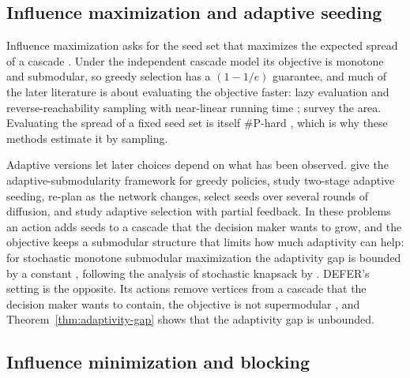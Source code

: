 \documentclass[preprint,11pt]{elsarticle}
\theoremstyle{definition}
\theoremstyle{remark}
\begin{document}
\subsection{Influence maximization and adaptive seeding}

Influence maximization asks for the seed set that maximizes the expected spread of a cascade \citep{kempe2003}. Under the independent cascade model its objective is monotone and submodular, so greedy selection has a $(1-1/e)$ guarantee, and much of the later literature is about evaluating the objective faster: lazy evaluation \citep{leskovec2007b} and reverse-reachability sampling with near-linear running time \citep{borgs2014,tang2014}; \citet{li2018} survey the area. Evaluating the spread of a fixed seed set is itself \#P-hard \citep{chen2010}, which is why these methods estimate it by sampling.

Adaptive versions let later choices depend on what has been observed. \citet{golovinkrause2011} give the adaptive-submodularity framework for greedy policies, \citet{seemansinger2013} study two-stage adaptive seeding, \citet{tong2017} re-plan as the network changes, \citet{sun2018} select seeds over several rounds of diffusion, and \citet{yuan2017} study adaptive selection with partial feedback. In these problems an action adds seeds to a cascade that the decision maker wants to grow, and the objective keeps a submodular structure that limits how much adaptivity can help: for stochastic monotone submodular maximization the adaptivity gap is bounded by a constant \citep{asadpournazerzadeh2016}, following the analysis of stochastic knapsack by \citet{deangoemansvondrak2008}. DEFER's setting is the opposite. Its actions remove vertices from a cascade that the decision maker wants to contain, the objective is not supermodular \citep{xie2023}, and Theorem~\ref{thm:adaptivity-gap} shows that the adaptivity gap is unbounded.

\subsection{Influence minimization and blocking}
\end{document}
